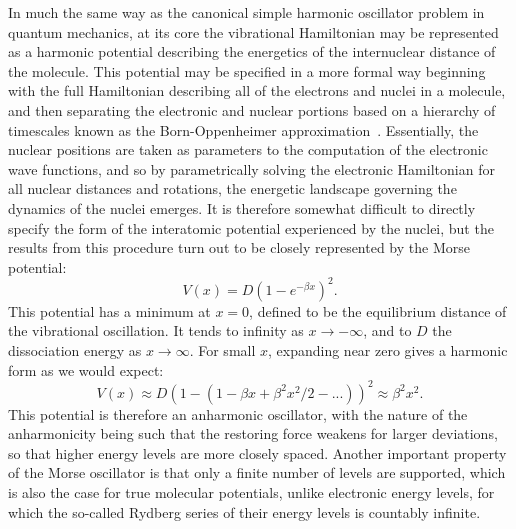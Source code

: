 In much the same way as the canonical simple harmonic oscillator problem in quantum mechanics, at its core the vibrational Hamiltonian may be represented as a harmonic potential describing the energetics of the internuclear distance of the molecule.
This potential may be specified in a more formal way beginning with the full Hamiltonian describing all of the electrons and nuclei in a molecule, and then separating the electronic and nuclear portions based on a hierarchy of timescales known as the Born-Oppenheimer approximation~\citep[Sec.~8.1]{Atkins2005}.
Essentially, the nuclear positions are taken as parameters to the computation of the electronic wave functions, and so by parametrically solving the electronic Hamiltonian for all nuclear distances and rotations, the energetic landscape governing the dynamics of the nuclei emerges.
It is therefore somewhat difficult to directly specify the form of the interatomic potential experienced by the nuclei, but the results from this procedure turn out to be closely represented by the Morse potential:
\begin{equation}
V(x) = D\left(1-e^{-\beta x}\right)^2.\label{eqmorse}
\end{equation}
This potential has a minimum at $x=0$, defined to be the equilibrium distance of the vibrational oscillation. It tends to infinity as $x\rightarrow-\infty$, and to $D$ the dissociation energy as $x\rightarrow\infty$. For small $x$, expanding near zero gives a harmonic form as we would expect:
\begin{equation}
V(x) \approx D\left(1-(1-\beta x + \beta^2 x^2 / 2 - ...)\right)^2 \approx \beta^2 x^2.
\end{equation}
This potential is therefore an anharmonic oscillator, with the nature of the anharmonicity being such that the restoring force weakens for larger deviations, so that higher energy levels are more closely spaced.
Another important property of the Morse oscillator is that only a finite number of levels are supported, which is also the case for true molecular potentials, unlike electronic energy levels, for which the so-called Rydberg series of their energy levels is countably infinite.

